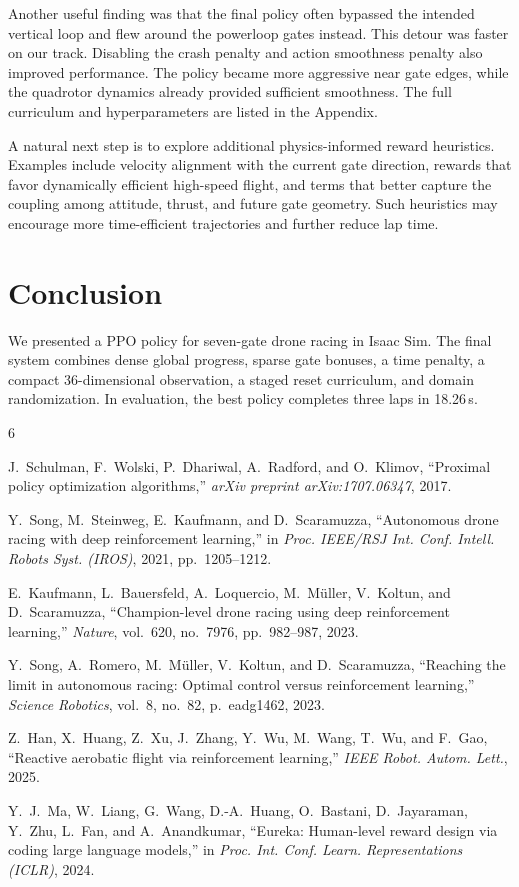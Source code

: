 \documentclass[conference]{IEEEtran}
\begin{document}
Another useful finding was that the final policy often bypassed the intended vertical loop and flew around the powerloop gates instead. This detour was faster on our track. Disabling the crash penalty and action smoothness penalty also improved performance. The policy became more aggressive near gate edges, while the quadrotor dynamics already provided sufficient smoothness. The full curriculum and hyperparameters are listed in the Appendix.

A natural next step is to explore additional physics-informed reward heuristics. Examples include velocity alignment with the current gate direction, rewards that favor dynamically efficient high-speed flight, and terms that better capture the coupling among attitude, thrust, and future gate geometry. Such heuristics may encourage more time-efficient trajectories and further reduce lap time.

\section{Conclusion}

We presented a PPO policy for seven-gate drone racing in Isaac Sim. The final system combines dense global progress, sparse gate bonuses, a time penalty, a compact 36-dimensional observation, a staged reset curriculum, and domain randomization. In evaluation, the best policy completes three laps in 18.26\,s.


\begin{thebibliography}{6}

J.~Schulman, F.~Wolski, P.~Dhariwal, A.~Radford, and O.~Klimov, ``Proximal policy optimization algorithms,'' \textit{arXiv preprint arXiv:1707.06347}, 2017.

Y.~Song, M.~Steinweg, E.~Kaufmann, and D.~Scaramuzza, ``Autonomous drone racing with deep reinforcement learning,'' in \textit{Proc. IEEE/RSJ Int. Conf. Intell. Robots Syst. (IROS)}, 2021, pp.~1205--1212.

E.~Kaufmann, L.~Bauersfeld, A.~Loquercio, M.~M{\"u}ller, V.~Koltun, and D.~Scaramuzza, ``Champion-level drone racing using deep reinforcement learning,'' \textit{Nature}, vol.~620, no.~7976, pp.~982--987, 2023.

Y.~Song, A.~Romero, M.~M{\"u}ller, V.~Koltun, and D.~Scaramuzza, ``Reaching the limit in autonomous racing: Optimal control versus reinforcement learning,'' \textit{Science Robotics}, vol.~8, no.~82, p.~eadg1462, 2023.

Z.~Han, X.~Huang, Z.~Xu, J.~Zhang, Y.~Wu, M.~Wang, T.~Wu, and F.~Gao, ``Reactive aerobatic flight via reinforcement learning,'' \textit{IEEE Robot. Autom. Lett.}, 2025.

Y.~J.~Ma, W.~Liang, G.~Wang, D.-A.~Huang, O.~Bastani, D.~Jayaraman, Y.~Zhu, L.~Fan, and A.~Anandkumar, ``Eureka: Human-level reward design via coding large language models,'' in \textit{Proc. Int. Conf. Learn. Representations (ICLR)}, 2024.

\end{thebibliography}
\end{document}
